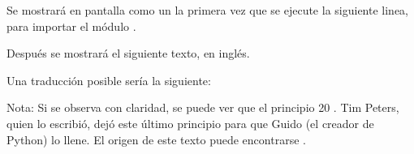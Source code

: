 Se mostrará en pantalla como un  la primera vez que se ejecute la siguiente linea, para importar el módulo .


Después se mostrará el siguiente texto, en inglés.


Una traducción posible sería la siguiente:


Nota: Si se observa con claridad, se puede ver que el principio 20 .
Tim Peters, quien lo escribió, dejó este último principio para que Guido (el creador de Python) lo llene.
El origen de este texto puede encontrarse .

\clearpage